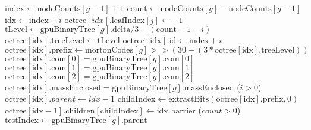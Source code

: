 \documentclass{thesis}
\begin{document}
\begin{algorithmic}
            \State $\text{index} \gets \text{nodeCounts}[g - 1] + 1$
            \State $\text{count} \gets \text{nodeCounts}[g] - \text{nodeCounts}[g-1]$
                    \State $\text{idx} \gets \text{index} + i$
                        \State $\text{octree}[idx].\text{leafIndex}[j] \gets -1$    
                    \EndFor
                    \State $\text{tLevel} \gets \text{gpuBinaryTree}[g].\text{delta}/3 - (\text{count} - 1 - i)$
                    \State $\text{octree}[\text{idx}].\text{treeLevel} \gets \text{tLevel}$
                    \State $\text{octree}[\text{idx}].\text{id} \gets \text{index} + i$
                    \State $\text{octree}[\text{idx}].\text{prefix} \gets \text{mortonCodes}[g] >> (30 - (3 * \text{octree}[\text{idx}].\text{treeLevel}))$
                    $\text{octree}[\text{idx}].\text{com}[0] = \text{gpuBinaryTree}[g].\text{com}[0]$
                    $\text{octree}[\text{idx}].\text{com}[1] = \text{gpuBinaryTree}[g].\text{com}[1]$
                    $\text{octree}[\text{idx}].\text{com}[2] = \text{gpuBinaryTree}[g].\text{com}[2]$
                    $\text{octree}[\text{idx}].\text{massEnclosed} = \text{gpuBinaryTree}[g].\text{massEnclosed}$
                    \If($i > 0$)
                        \State $\text{octree}[\text{idx}].parent \gets idx - 1$
                        \State $\text{childIndex} \gets \text{extractBits}(\text{octree}[\text{idx}].\text{prefix}, 0)$
                        \State $\text{octree}[\text{idx} - 1].\text{children}[\text{childIndex}] \gets \text{idx}$
                    \EndIf
                \EndFor
            \EndIf
            \State $\text{barrier}$
            \If($count > 0$)
                \State $\text{testIndex} \gets \text{gpuBinaryTree}[g].\text{parent}$
            \EndIf
        \Else
    

\end{algorithmic}
\end{document}
